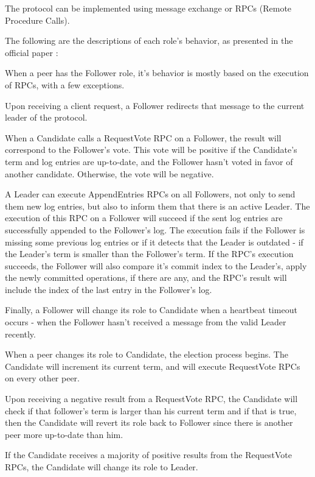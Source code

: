 The protocol can be implemented using message exchange or RPCs (Remote Procedure Calls). 

The following are the descriptions of each role’s behavior, as presented in the official paper \cite{raft}:

When a peer has the Follower role, it’s behavior is mostly based on the execution of RPCs, with a few exceptions.

Upon receiving a client request, a Follower redirects that message to the current leader of the protocol.

When a Candidate calls a RequestVote RPC on a Follower, the result will correspond to the Follower’s vote. This vote will be positive if the Candidate’s term and log entries are up-to-date, and the Follower hasn’t voted in favor of another candidate. Otherwise, the vote will be negative.

A Leader can execute AppendEntries RPCs on all Followers, not only to send them new log entries, but also to inform them that there is an active Leader. The execution of this RPC on a Follower will succeed if the sent log entries are successfully appended to the Follower’s log. The execution fails if the Follower is missing some previous log entries or if it detects that the Leader is outdated - if the Leader’s term is smaller than the Follower’s term. If the RPC’s execution succeeds, the Follower will also compare it’s commit index to the Leader’s, apply the newly committed operations, if there are any, and the RPC’s result will include the index of the last entry in the Follower’s log.

Finally, a Follower will change its role to Candidate when a heartbeat timeout occurs - when the Follower hasn’t received a message from the valid Leader recently.

\vspace{0.5cm}

When a peer changes its role to Candidate, the election process begins. The Candidate will increment its current term, and will execute RequestVote RPCs on every other peer.

Upon receiving a negative result from a RequestVote RPC, the Candidate will check if that follower’s term is larger than his current term and if that is true, then the Candidate will revert its role back to Follower since there is another peer more up-to-date than him.

If the Candidate receives a majority of positive results from the RequestVote RPCs, the Candidate will change its role to Leader.

